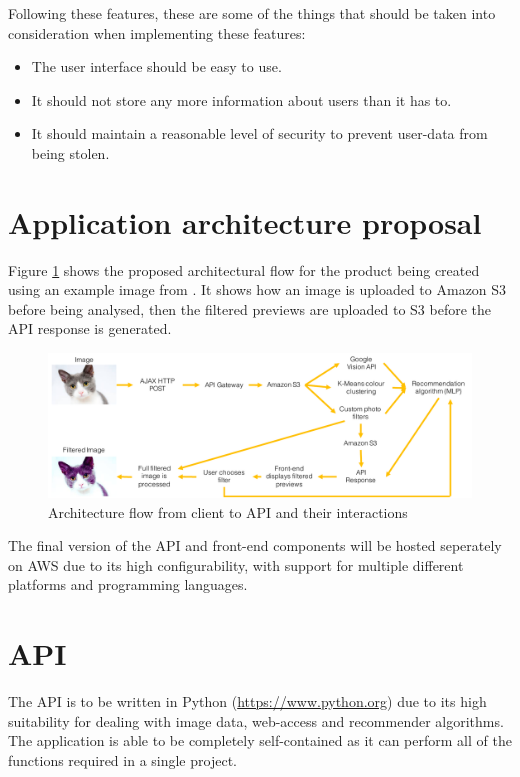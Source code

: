 \documentclass[a4paper,12pt]{report}
\begin{document}
    Following these features, these are some of the things that should be taken into consideration when implementing these features:

      \begin{itemize}
        \item The user interface should be easy to use.
        \item It should not store any more information about users than it has to.
        \item It should maintain a reasonable level of security to prevent user-data from being stolen.
      \end{itemize}

  \section{Application architecture proposal}
    Figure \ref{fig:application-diagram} shows the proposed architectural flow for the product being created using an example image from \cite{cat2013image}. It shows how an image is uploaded to Amazon S3 before being analysed, then the filtered previews are uploaded to S3 before the API response is generated.

    \begin{figure}[h]
      \centering
      \includegraphics[width=\linewidth]{application-diagram}
      \caption{Architecture flow from client to API and their interactions}
      \label{fig:application-diagram}
    \end{figure}

    The final version of the API and front-end components will be hosted seperately on AWS due to its high configurability, with support for multiple different platforms and programming languages.

  \section{API}
    The API is to be written in Python (\url{https://www.python.org}) due to its high suitability for dealing with image data, web-access and recommender algorithms. The application is able to be completely self-contained as it can perform all of the functions required in a single project.
\end{document}
